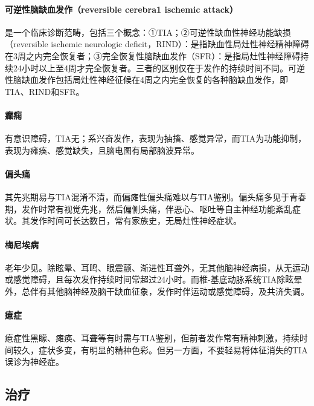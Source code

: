 \paragraph{可逆性脑缺血发作（reversible cerebra1 ischemic attack）}

是一个临床诊断范畴，包括三个概念：①TIA；②可逆性缺血性神经功能缺损（reversible
ischemic neurologic
deficit，RIND）：是指缺血性局灶性神经精神障碍在3周之内完全恢复者；③完全恢复性脑缺血发作（SFR）：是指局灶性神经障碍持续24小时以上至4周才完全恢复者。三者的区别仅在于发作的持续时间不同。可逆性脑缺血发作包括局灶性神经征候在4周之内完全恢复的各种脑缺血发作，即TIA、RIND和SFR。

\paragraph{癫痫}

有意识障碍，TIA无；系兴奋发作，表现为抽搐、感觉异常，而TIA为功能抑制，表现为瘫痪、感觉缺失，且脑电图有局部脑波异常。

\paragraph{偏头痛}

其先兆期易与TIA混淆不清，而偏瘫性偏头痛难以与TIA鉴别。偏头痛多见于青春期，发作时常有视觉先兆，然后偏侧头痛，伴恶心、呕吐等自主神经功能紊乱症状。其发作时间可长达数日，常有家族史，无局灶性神经症状。

\paragraph{梅尼埃病}

老年少见。除眩晕、耳鸣、眼震颤、渐进性耳聋外，无其他脑神经病损，从无运动或感觉障碍，且每次发作持续时间常超过24小时。而椎-基底动脉系统TIA除眩晕外，总伴有其他脑神经及脑干缺血征象，发作时伴运动或感觉障碍，及共济失调。

\paragraph{癔症}

癔症性黑矇、瘫痪、耳聋等有时需与TIA鉴别，但前者发作常有精神刺激，持续时间较久，症状多变，有明显的精神色彩。但另一方面，不要轻易将体征消失的TIA误诊为神经症。

\subsection{治疗}

